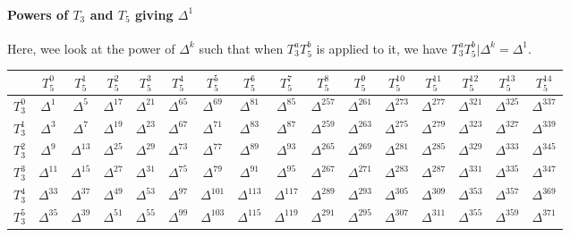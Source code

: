 \paragraph{Powers of $T_3$ and $T_5$ giving $\Delta^1$}
\label{table:OperatorToDelta1}
Here, wee look at the power of $\Delta^k$ such that when $T_3^aT_5^b$ is applied to it, we have $T_3^aT_5^b|\Delta^k = \Delta^1$.
\begin{center}
	\begin{tabular}{|c||c|c|c|c|c|c|c|c|c|c|c|c|c|c|c|}
		\hline
		\textbf{} & \textbf{$T_5^{0}$} & \textbf{$T_5^{1}$} & \textbf{$T_5^{2}$} & \textbf{$T_5^{3}$} & \textbf{$T_5^{4}$} & \textbf{$T_5^{5}$} & \textbf{$T_5^{6}$} & \textbf{$T_5^{7}$} & \textbf{$T_5^{8}$} & \textbf{$T_5^{9}$} & \textbf{$T_5^{10}$} & \textbf{$T_5^{11}$} & \textbf{$T_5^{12}$} & \textbf{$T_5^{13}$} & \textbf{$T_5^{14}$} \\
		\hline\hline
		$T_3^{0}$ & $\Delta^{1}$ & $\Delta^{5}$ & $\Delta^{17}$ & $\Delta^{21}$ & $\Delta^{65}$ & $\Delta^{69}$ & $\Delta^{81}$ & $\Delta^{85}$ & $\Delta^{257}$ & $\Delta^{261}$ & $\Delta^{273}$ & $\Delta^{277}$ & $\Delta^{321}$ & $\Delta^{325}$ & $\Delta^{337}$ \\
		$T_3^{1}$ & $\Delta^{3}$ & $\Delta^{7}$ & $\Delta^{19}$ & $\Delta^{23}$ & $\Delta^{67}$ & $\Delta^{71}$ & $\Delta^{83}$ & $\Delta^{87}$ & $\Delta^{259}$ & $\Delta^{263}$ & $\Delta^{275}$ & $\Delta^{279}$ & $\Delta^{323}$ & $\Delta^{327}$ & $\Delta^{339}$ \\
		$T_3^{2}$ & $\Delta^{9}$ & $\Delta^{13}$ & $\Delta^{25}$ & $\Delta^{29}$ & $\Delta^{73}$ & $\Delta^{77}$ & $\Delta^{89}$ & $\Delta^{93}$ & $\Delta^{265}$ & $\Delta^{269}$ & $\Delta^{281}$ & $\Delta^{285}$ & $\Delta^{329}$ & $\Delta^{333}$ & $\Delta^{345}$ \\
		$T_3^{3}$ & $\Delta^{11}$ & $\Delta^{15}$ & $\Delta^{27}$ & $\Delta^{31}$ & $\Delta^{75}$ & $\Delta^{79}$ & $\Delta^{91}$ & $\Delta^{95}$ & $\Delta^{267}$ & $\Delta^{271}$ & $\Delta^{283}$ & $\Delta^{287}$ & $\Delta^{331}$ & $\Delta^{335}$ & $\Delta^{347}$ \\
		$T_3^{4}$ & $\Delta^{33}$ & $\Delta^{37}$ & $\Delta^{49}$ & $\Delta^{53}$ & $\Delta^{97}$ & $\Delta^{101}$ & $\Delta^{113}$ & $\Delta^{117}$ 
		& $\Delta^{289}$ & $\Delta^{293}$ & $\Delta^{305}$ & $\Delta^{309}$ & $\Delta^{353}$ & $\Delta^{357}$ & $\Delta^{369}$ \\
		$T_3^{5}$ & $\Delta^{35}$ & $\Delta^{39}$ & $\Delta^{51}$ & $\Delta^{55}$ & $\Delta^{99}$ & $\Delta^{103}$ & $\Delta^{115}$ & $\Delta^{119}$ 
		& $\Delta^{291}$ & $\Delta^{295}$ & $\Delta^{307}$ & $\Delta^{311}$ & $\Delta^{355}$ & $\Delta^{359}$ & $\Delta^{371}$ \\

\end{tabular}
\end{center}
